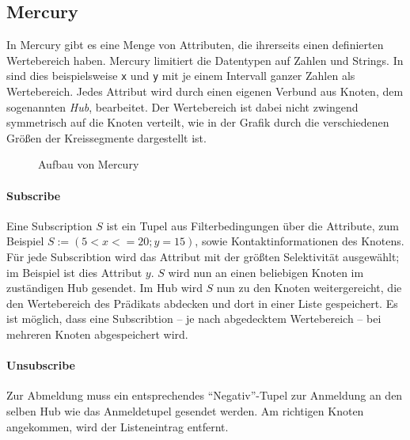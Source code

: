 \subsection{Mercury}
\label{chap:related:mercury}
In Mercury \cite{Bharambe2004Mercury} gibt es eine Menge von Attributen, die ihrerseits einen definierten Wertebereich haben. Mercury limitiert die Datentypen auf Zahlen und Strings. In  sind dies beispielsweise \texttt{x} und \texttt{y} mit je einem Intervall ganzer Zahlen als Wertebereich. Jedes Attribut wird durch einen eigenen Verbund aus Knoten, dem sogenannten \emph{Hub}, bearbeitet. Der Wertebereich ist dabei nicht zwingend symmetrisch auf die Knoten verteilt, wie in der Grafik durch die verschiedenen Größen der Kreissegmente dargestellt ist. 

\begin{figure}[htbp]
\centering
{}
\caption{Aufbau von Mercury}
\label{fig:mercury}
\end{figure}

\paragraph{Subscribe}
Eine Subscription $S$ ist ein Tupel aus Filterbedingungen über die Attribute, zum Beispiel $S := (5 < x <= 20; y = 15)$, sowie Kontaktinformationen des Knotens. Für jede Subscribtion wird das Attribut mit der größten Selektivität ausgewählt; im Beispiel ist dies Attribut $y$. $S$ wird nun an einen beliebigen Knoten im zuständigen Hub gesendet. Im Hub wird $S$ nun zu den Knoten weitergereicht, die den Wertebereich des Prädikats abdecken und dort in einer Liste gespeichert. Es ist möglich, dass eine Subscribtion -- je nach abgedecktem Wertebereich -- bei mehreren Knoten abgespeichert wird.

\paragraph{Unsubscribe}
Zur Abmeldung muss ein entsprechendes \enquote{Negativ}-Tupel zur Anmeldung an den selben Hub wie das Anmeldetupel gesendet werden. Am richtigen Knoten angekommen, wird der Listeneintrag entfernt.

